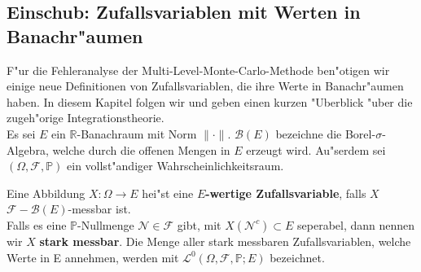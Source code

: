 \subsection{Einschub: Zufallsvariablen mit Werten in Banachr"aumen}
F"ur die Fehleranalyse der Multi-Level-Monte-Carlo-Methode ben"otigen wir einige neue Definitionen von Zufallsvariablen, die ihre Werte in Banachr"aumen haben. In diesem Kapitel folgen wir \cite{Heinrich} und geben einen kurzen "Uberblick "uber die zugeh"orige Integrationstheorie.\\[0,2cm]

Es sei $E$ ein $\mathbb{R}$-Banachraum mit Norm $\|\cdot\|$. $\mathcal{B}(E)$ bezeichne die Borel-$\sigma$-Algebra, welche durch die offenen Mengen in $E$ erzeugt wird. Au"serdem sei $(\Omega,\mathcal{F},\mathbb{P})$ ein vollst"andiger Wahrscheinlichkeitsraum.

\begin{df}
Eine Abbildung $X:\Omega\rightarrow E$ hei"st eine \textbf{$E$-wertige Zufallsvariable}, falls $X$ $\mathcal{F}-\mathcal{B}(E)$-messbar ist.\\
Falls es eine $\mathbb{P}$-Nullmenge $\mathcal{N}\in\mathcal{F}$ gibt,  mit $X(\mathcal{N}^c)\subset E$ seperabel, dann nennen wir $X$ \textbf{stark messbar}. Die Menge aller stark messbaren Zufallsvariablen, welche Werte in E annehmen, werden mit $\mathcal{L}^0(\Omega,\mathcal{F},\mathbb{P};E)$ bezeichnet.
\end{df}

